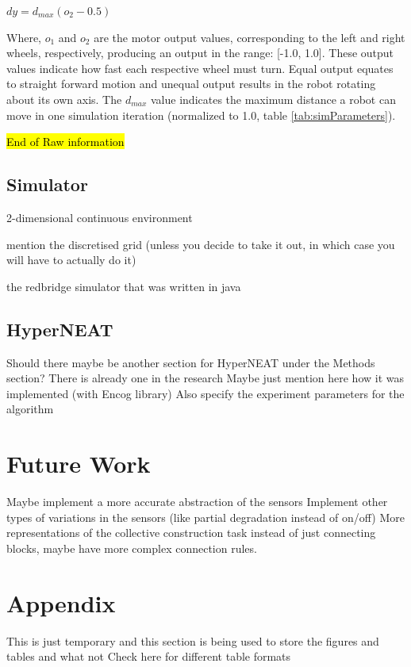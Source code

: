 \documentclass[conference]{IEEEtran}
\begin{document}
$\textit{dy} = d_{max} (o_{2} - 0.5)$

Where, $o_{1}$ and $o_{2}$ are the motor output values, corresponding
to the left and right wheels, respectively, producing an output in the range:
[-1.0, 1.0].
These output values indicate how fast each respective wheel must turn.
Equal output equates to straight forward motion and unequal output results
in the robot rotating about its own axis.
The $d_{max}$ value indicates the maximum distance a robot can move in
one simulation iteration (normalized to 1.0, table \ref{tab:simParameters}).

\hl{End of Raw information}



\subsection{Simulator}

2-dimensional continuous environment

mention the discretised grid (unless you decide to take it out, in which case you will have to actually do it)

the redbridge simulator that was written in java

\subsection{HyperNEAT}
Should there maybe be another section for HyperNEAT under the Methods section? 
There is already one in the research
Maybe just mention here how it was implemented (with Encog library)
Also specify the experiment parameters for the algorithm



\section{Future Work}
Maybe implement a more accurate abstraction of the sensors
Implement other types of variations in the sensors (like partial degradation instead of on/off)
More representations of the collective construction task instead of just connecting blocks, maybe have more complex connection rules.




\section{Appendix}
This is just temporary and this section is being used to store the figures and tables and what not 
Check here for different table formats
\end{document}
